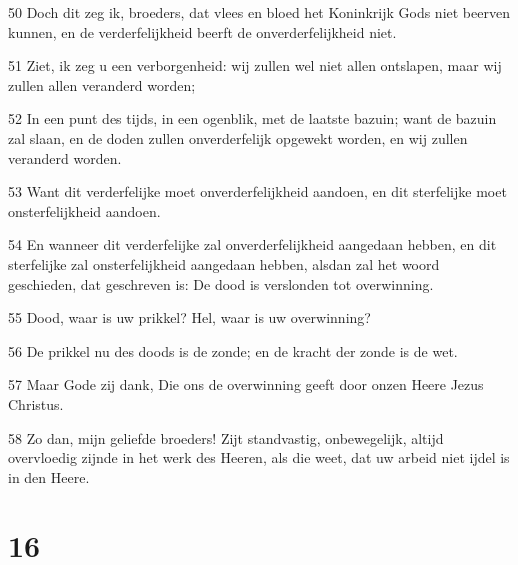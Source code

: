 \par 50 Doch dit zeg ik, broeders, dat vlees en bloed het Koninkrijk Gods niet beerven kunnen, en de verderfelijkheid beerft de onverderfelijkheid niet.
\par 51 Ziet, ik zeg u een verborgenheid: wij zullen wel niet allen ontslapen, maar wij zullen allen veranderd worden;
\par 52 In een punt des tijds, in een ogenblik, met de laatste bazuin; want de bazuin zal slaan, en de doden zullen onverderfelijk opgewekt worden, en wij zullen veranderd worden.
\par 53 Want dit verderfelijke moet onverderfelijkheid aandoen, en dit sterfelijke moet onsterfelijkheid aandoen.
\par 54 En wanneer dit verderfelijke zal onverderfelijkheid aangedaan hebben, en dit sterfelijke zal onsterfelijkheid aangedaan hebben, alsdan zal het woord geschieden, dat geschreven is: De dood is verslonden tot overwinning.
\par 55 Dood, waar is uw prikkel? Hel, waar is uw overwinning?
\par 56 De prikkel nu des doods is de zonde; en de kracht der zonde is de wet.
\par 57 Maar Gode zij dank, Die ons de overwinning geeft door onzen Heere Jezus Christus.
\par 58 Zo dan, mijn geliefde broeders! Zijt standvastig, onbewegelijk, altijd overvloedig zijnde in het werk des Heeren, als die weet, dat uw arbeid niet ijdel is in den Heere.

\chapter{16}

